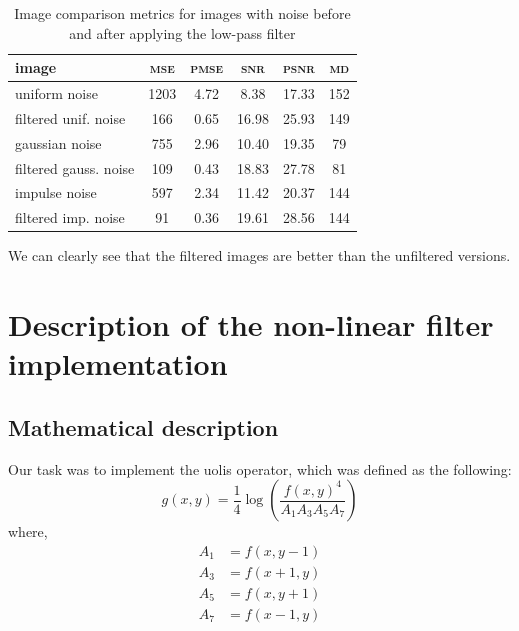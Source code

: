 \documentclass[12pt]{article}
\begin{document}
\begin{table}[H]\centering
    \begin{tabular}{l|ccccc}
        \toprule
        image                 & \textsc{mse} & \textsc{pmse} & \textsc{snr} & \textsc{psnr} & \textsc{md} \\
        \midrule[.5pt]
        uniform noise         & 1203         & 4.72          & 8.38         & 17.33         & 152         \\
        filtered unif. noise  & 166          & 0.65          & 16.98        & 25.93         & 149         \\
        \midrule[.1pt]
        gaussian noise        & 755          & 2.96          & 10.40        & 19.35         & 79          \\
        filtered gauss. noise & 109          & 0.43          & 18.83        & 27.78         & 81          \\
        \midrule[.1pt]
        impulse noise         & 597          & 2.34          & 11.42        & 20.37         & 144         \\
        filtered imp. noise   & 91           & 0.36          & 19.61        & 28.56         & 144         \\
        \bottomrule
    \end{tabular}
    \caption{Image comparison metrics for images with noise before and after applying the low-pass filter}
    \label{tab:lowpass-results-noise}
\end{table}

We can clearly see that the filtered images are better than the unfiltered versions.


\pagebreak[3]
\section{Description of the non-linear filter implementation }

\subsection{Mathematical description}

Our task was to implement the uolis operator, which was defined as the following:
\begin{equation}
    g(x,y) = \frac{1}{4} \log \left(
        \frac{f(x,y)^4}{A_1 A_3 A_5 A_7}
    \right)
    \label{eq:uolis}
\end{equation}
where,
\begin{align*}
    A_1 &= f(x,y-1) \\
    A_3 &= f(x+1,y) \\
    A_5 &= f(x,y+1) \\
    A_7 &= f(x-1,y)
\end{align*}
\end{document}
